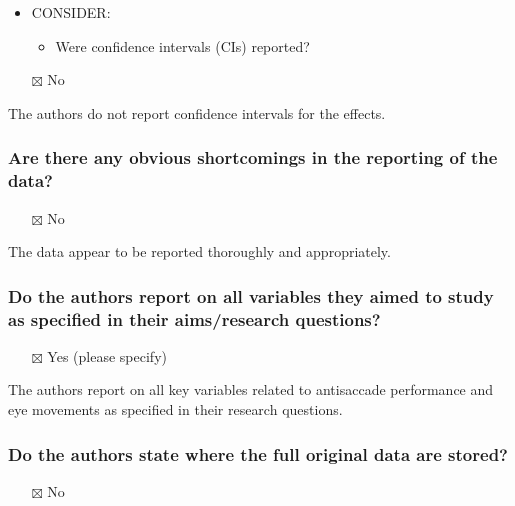 \documentclass[
  doc, a4paper]{apa7}
\providecommand{\tightlist}{%
  \setlength{\itemsep}{0pt}\setlength{\parskip}{0pt}}
\begin{document}
\begin{itemize}
\tightlist
\item
  CONSIDER:

  \begin{itemize}
  \tightlist
  \item
    Were confidence intervals (CIs) reported?
  \end{itemize}
\item[$\boxtimes$]
  No
\end{itemize}

The authors do not report confidence intervals for the effects.

\subsubsection{Are there any obvious shortcomings in the reporting of the data?}\label{are-there-any-obvious-shortcomings-in-the-reporting-of-the-data}

\begin{itemize}
\tightlist
\item[$\boxtimes$]
  No
\end{itemize}

The data appear to be reported thoroughly and appropriately.

\subsubsection{Do the authors report on all variables they aimed to study as specified in their aims/research questions?}\label{do-the-authors-report-on-all-variables-they-aimed-to-study-as-specified-in-their-aimsresearch-questions}

\begin{itemize}
\tightlist
\item[$\boxtimes$]
  Yes (please specify)
\end{itemize}

The authors report on all key variables related to antisaccade performance and eye movements as specified in their research questions.

\subsubsection{Do the authors state where the full original data are stored?}\label{do-the-authors-state-where-the-full-original-data-are-stored}

\begin{itemize}
\tightlist
\item[$\boxtimes$]
  No
\end{itemize}
\end{document}
